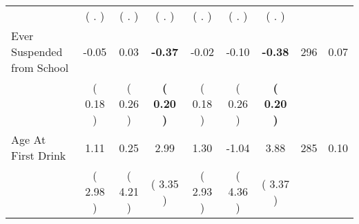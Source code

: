 \begin{tabular}{lcccccccc}
 & (        . ) & (        . ) & (        . ) & (        . ) & (        . ) & (        . ) & \\
Ever Suspended from School &     -0.05 &      0.03 & \textbf{    -0.37} &     -0.02 &     -0.10 & \textbf{    -0.38} & 296 &       0.07 \\ 
 & (     0.18 ) & (     0.26 ) & \textbf{(     0.20 )} & (     0.18 ) & (     0.26 ) & \textbf{(     0.20 )} & \\
Age At First Drink &      1.11 &      0.25 &      2.99 &      1.30 &     -1.04 &      3.88 & 285 &       0.10 \\ 
 & (     2.98 ) & (     4.21 ) & (     3.35 ) & (     2.93 ) & (     4.36 ) & (     3.37 ) & \\
\bottomrule
\end{tabular}
